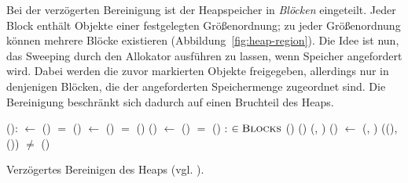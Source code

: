 Bei der verzögerten Bereinigung ist der Heapspeicher in \textit{Blöcken} eingeteilt.
Jeder Block enthält Objekte einer festgelegten Größenordnung; zu jeder Größenordnung können mehrere Blöcke existieren (Abbildung~\ref{fig:heap-region}).
Die Idee ist nun, das Sweeping durch den Allokator ausführen zu lassen, wenn Speicher angefordert wird.
Dabei werden die zuvor markierten Objekte freigegeben, allerdings nur in denjenigen Blöcken, die der angeforderten Speichermenge zugeordnet sind.
Die Bereinigung beschränkt sich dadurch auf einen Bruchteil des Heaps.

\begin{algorithm}[h]
\begin{algorithmic}[1]
	\State {}():
	\State \quad {} $\gets$ ()
	\State \quad \IF {} $=$ \Null
	\State \quad \quad {}()	
	\State \quad \quad {} $\gets$ ()	
	\State \quad \quad \IF {} $=$ \Null
	\State \quad \quad \quad {}()		
	\State \quad \quad \quad {}()	
	\State \quad \quad \quad {} $\gets$ ()	
	\State \quad \quad \quad \IF {} $=$ \Null
	\State \quad \quad \quad \quad {}()
	\State \quad \Return {}
	\Statex
	\State {}:
	\State \quad {}		
	\State \quad \FOREACH {} $\in \textsc{Blocks}$
	\State \quad \quad \IF \NOT {}()
	\State \quad \quad \quad {}()	
	\State \quad \quad \ELSE {}(, )
	\Statex
	\State {}()
	\State \quad \Do
	\State \quad \quad {} $\gets$ (, )
	\State \quad \quad \IF {}((), ())
	\State \quad \quad \quad \Return	{}
	\State \quad \WHILE {} $\neq$ 
	\State \quad {}()	
\end{algorithmic}
\caption[Verzögertes Bereinigen des Heaps]{Verzögertes Bereinigen des Heaps (vgl. \cite[S. 25]{handbook}).}
\label{algo:lazy-sweep}
\end{algorithm}

